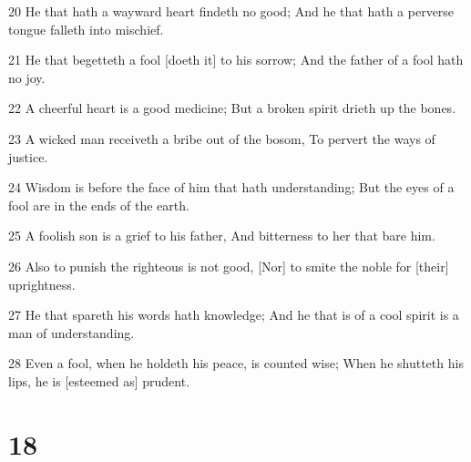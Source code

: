 \par 20 He that hath a wayward heart findeth no good; And he that hath a perverse tongue falleth into mischief.
\par 21 He that begetteth a fool [doeth it] to his sorrow; And the father of a fool hath no joy.
\par 22 A cheerful heart is a good medicine; But a broken spirit drieth up the bones.
\par 23 A wicked man receiveth a bribe out of the bosom, To pervert the ways of justice.
\par 24 Wisdom is before the face of him that hath understanding; But the eyes of a fool are in the ends of the earth.
\par 25 A foolish son is a grief to his father, And bitterness to her that bare him.
\par 26 Also to punish the righteous is not good, [Nor] to smite the noble for [their] uprightness.
\par 27 He that spareth his words hath knowledge; And he that is of a cool spirit is a man of understanding.
\par 28 Even a fool, when he holdeth his peace, is counted wise; When he shutteth his lips, he is [esteemed as] prudent.

\chapter{18}

